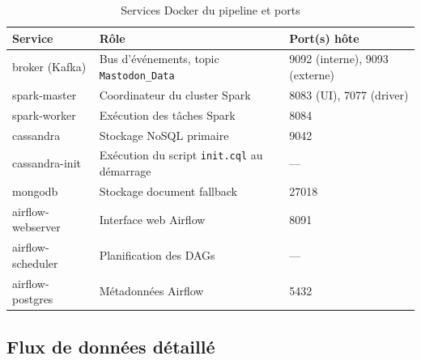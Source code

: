 \documentclass[12pt,a4paper]{article}
\begin{document}
\begin{table}[H]
  \centering
  \begin{tabular}{@{}lll@{}}
    \toprule
    \textbf{Service} & \textbf{Rôle} & \textbf{Port(s) hôte} \\
    \midrule
    broker (Kafka) & Bus d'événements, topic \texttt{Mastodon\_Data} & 9092 (interne), 9093 (externe) \\
    spark-master & Coordinateur du cluster Spark & 8083 (UI), 7077 (driver) \\
    spark-worker & Exécution des tâches Spark & 8084 \\
    cassandra & Stockage NoSQL primaire & 9042 \\
    cassandra-init & Exécution du script \texttt{init.cql} au démarrage & --- \\
    mongodb & Stockage document fallback & 27018 \\
    airflow-webserver & Interface web Airflow & 8091 \\
    airflow-scheduler & Planification des DAGs & --- \\
    airflow-postgres & Métadonnées Airflow & 5432 \\
    \bottomrule
  \end{tabular}
  \caption{Services Docker du pipeline et ports}
\end{table}

\subsection{Flux de données détaillé}
\end{document}
